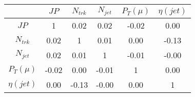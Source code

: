 \begin{tabular}{|c|c|c|c|c|c|} 
\hline
 & $JP$ & $N_{trk}$ & $N_{jet}$ & $P_{T} (\mu)$ & $\eta (jet)$ \\ \hline
$JP$ & 1 & 0.02 & 0.02 & -0.02 & 0.00 \\
$N_{trk}$ & 0.02 & 1 & 0.01 & 0.00 & -0.13 \\
$N_{jet}$ & 0.02 & 0.01 & 1 & -0.01 & -0.00 \\
$P_{T} (\mu)$ & -0.02 & 0.00 & -0.01 & 1 & 0.00 \\
$\eta (jet)$ & 0.00 & -0.13 & -0.00 & 0.00 & 1 \\
\hline 
\end{tabular} 


